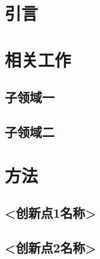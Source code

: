 \documentclass{cjc}
\begin{document}
\maketitle

\section{引言}


\section{相关工作}


\subsection{子领域一}

\subsection{子领域二}

\section{方法}


\subsection{<创新点1名称>}


\subsection{<创新点2名称>}

\end{document}
